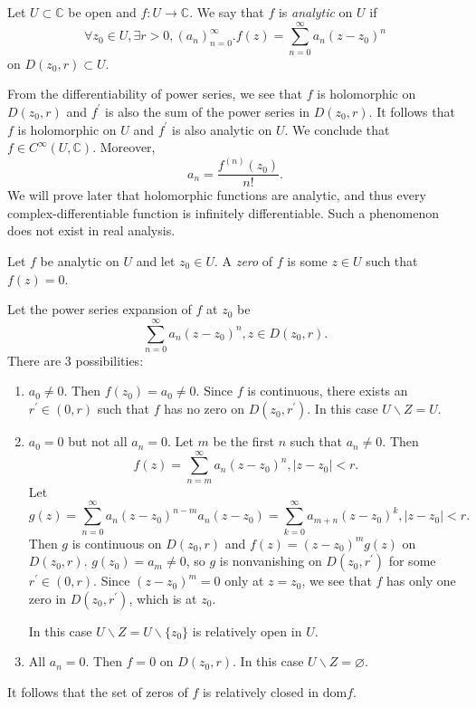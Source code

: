 \begin{defn}
  Let $U \subset \mathbb{C}$ be open and $f : U \to \mathbb{C}$.
  We say that $f$ is \emph{analytic} on $U$ if
  $$
  \forall z_0 \in U, \exists r > 0, (a_n)_{n=0}^\infty .
  f(z) = \sum_{n=0}^\infty a_n (z - z_0)^n
  $$
  on $D(z_0, r) \subset U$.
\end{defn}

From the differentiability of power
series, we see that $f$ is holomorphic on $D(z_0, r)$ and
$f^\prime$ is also the sum of the power series in $D(z_0, r)$.
It follows that $f$ is holomorphic on $U$ and $f^\prime$ is also
analytic on $U$. We conclude that
$f \in C^\infty(U, \mathbb{C})$. Moreover,
$$
a_n = \frac{f^{(n)}(z_0)}{n!}.
$$
We will prove later that holomorphic functions are analytic,
and thus every complex-differentiable function is infinitely
differentiable. Such a phenomenon does not exist in real analysis.

\begin{defn}
Let $f$ be analytic on $U$ and let $z_0 \in U$. A
\emph{zero} of $f$ is some $z \in U$ such that $f(z) = 0$.
\end{defn}

Let the power series expansion of $f$ at $z_0$ be
$$
\sum_{n=0}^\infty a_n (z - z_0)^n, z \in D(z_0, r).
$$
There are 3 possibilities:
\begin{enumerate}
  \item{
    $a_0 \neq 0$. Then $f(z_0) = a_0 \neq 0$. Since $f$ is
    continuous, there exists an $r^\prime \in (0, r)$ such that
    $f$ has no zero on $D(z_0, r^\prime)$. In this case
    $U \backslash Z = U$.
  }
  \item{
    $a_0 = 0$ but not all $a_n = 0$. Let $m$ be the first
    $n$ such that $a_n \neq 0$. Then
    $$
    f(z) = \sum_{n=m}^\infty a_n (z - z_0)^n, |z - z_0| < r.
    $$
    Let
    $$
    g(z) = \sum_{n=0}^\infty a_n (z - z_0)^{n - m} a_n (z - z_0)
         = \sum_{k=0}^\infty a_{m+n} (z - z_0)^k, |z - z_0| < r.
    $$
    Then $g$ is continuous on $D(z_0, r)$ and
    $f(z) = (z - z_0)^m g(z)$ on $D(z_0, r)$.
    $g(z_0) = a_m \neq 0$, so $g$ is nonvanishing on $D(z_0, r^\prime)$
    for some $r^\prime \in (0, r)$. Since $(z - z_0)^m = 0$ only at
    $z = z_0$, we see that $f$ has only one zero in
    $D(z_0, r^\prime)$, which is at $z_0$.

    In this case $U \backslash Z = U \backslash \{ z_0 \}$
    is relatively open in $U$.
  }
  \item{
    All $a_n = 0$. Then $f = 0$ on $D(z_0, r)$. In this case
    $U \backslash Z = \varnothing$.
  }
\end{enumerate}
It follows that the set of zeros of $f$ is relatively closed in
$\mathrm{dom} f$.

